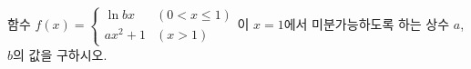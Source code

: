 함수 $f(x)=\begin{cases} \ln bx & (0<x\le 1) \\ ax^2+1 & (x>1) \end{cases}$이 $x=1$에서 미분가능하도록 하는 상수 $a$, $b$의 값을 구하시오.
